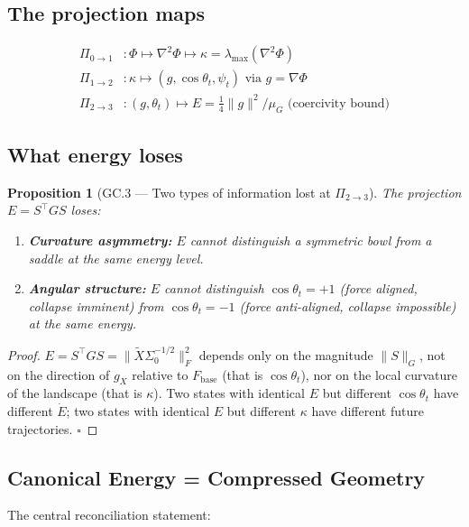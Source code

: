 \documentclass[11pt,a4paper]{article}
\newtheorem{proposition}[theorem]{Proposition}
\theoremstyle{definition}
\newcommand{\Fbase}{F_{\mathrm{base}}}
\newcommand{\gX}{g_X}
\begin{document}
\subsection{The projection maps}

\begin{align*}
\Pi_{0\to1}&: \Phi \mapsto \nabla^2\Phi \mapsto \kappa = \lambda_\mathrm{max}(\nabla^2\Phi)\\
\Pi_{1\to2}&: \kappa \mapsto (g, \cos\theta_t,\psi_t)\text{ via }g=\nabla\Phi\\
\Pi_{2\to3}&: (g,\theta_t)\mapsto E = \tfrac{1}{4}\|g\|^2/\mu_G\text{ (coercivity bound)}
\end{align*}

\subsection{What energy loses}

\begin{proposition}[GC.3 --- Two types of information lost at $\Pi_{2\to3}$]
The projection $E = S^\top GS$ loses:
\begin{enumerate}
\item \textbf{Curvature asymmetry:} $E$ cannot distinguish a symmetric bowl from
  a saddle at the same energy level.
\item \textbf{Angular structure:} $E$ cannot distinguish $\cos\theta_t=+1$
  (force aligned, collapse imminent) from $\cos\theta_t=-1$ (force anti-aligned,
  collapse impossible) at the same energy.
\end{enumerate}
\end{proposition}

\begin{proof}
$E = S^\top GS = \|\tilde X\Sigma_0^{-1/2}\|_F^2$ depends only on the magnitude
$\|S\|_G$, not on the direction of $\gX$ relative to $\Fbase$ (that is $\cos\theta_t$),
nor on the local curvature of the landscape (that is $\kappa$).
Two states with identical $E$ but different $\cos\theta_t$ have different $\dot E$;
two states with identical $E$ but different $\kappa$ have different future
trajectories. $\square$
\end{proof}

\subsection{Canonical Energy = Compressed Geometry}

The central reconciliation statement:
\end{document}
